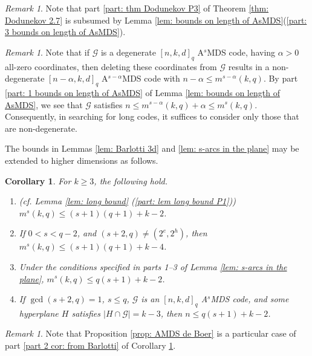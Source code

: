 \documentclass[11pt,a4paper]{amsart}
\newcommand{\AS}{ A$^s$MDS }
\newcommand{\G}{\mathcal{G}}
\theoremstyle{plain}
\newtheorem{corollary}[theorem]{Corollary}
\theoremstyle{definition}
\theoremstyle{remark}
\newtheorem{remark}[theorem]{Remark}
\begin{document}
	\begin{remark}
		Note that part  \ref{part: thm Dodunekov P3} of Theorem \ref{thm: Dodunekov 2.7}   is subsumed by Lemma \ref{lem: bounds on length of AsMDS}(\ref{part: 3 bounds on length of AsMDS}).
	\end{remark}

	\begin{remark}\label{rem: degenerate can be ignored}
		Note that if $\G$ is a degenerate $[n,k,d]_q$ \AS code, having $\alpha>0$ all-zero coordinates, then deleting these coordinates from $\G$ results in a non-degenerate $[n-\alpha, k, d]_q$ A$^{s-\alpha}$MDS code with $n-\alpha \le m^{s-\alpha}(k,q) $. By part \ref{part: 1 bounds on length of AsMDS} of Lemma \ref{lem: bounds on length of AsMDS}, we see that $\G$ satisfies $n\le m^{s-\alpha}(k,q)+\alpha \le m^s(k,q)$. Consequently, in searching for long codes, it suffices to consider only those that are non-degenerate.
	\end{remark}

	The bounds in Lemmas \ref{lem: Barlotti 3d}  and \ref{lem: s-arcs in the plane} may be extended to higher dimensions as follows.
	\begin{corollary}\label{cor: from Barlotti} For $k\ge 3$, the following hold.
		\begin{enumerate}
			\item  (cf. Lemma \ref{lem: long bound} (\ref{part: lem long bound P1}))  $m^s(k,q)\le (s+1)(q+1)+k-2$. \label{part 1 cor: from Barlotti}
			\item  If  $0<s< q-2$, and $(s+2,q) \ne (2^e,2^h)$, then $m^s(k,q)\le (s+1)(q+1)+k-4$. \label{part 2 cor: from Barlotti}
			\item Under the conditions specified in parts 1--3 of Lemma \ref{lem: s-arcs in the plane}, $m^s(k,q)\le q(s+1)+k-2$. \label{part 4 cor: from Barlotti}
			\item  If $\gcd(s+2,q)=1$, $s\le q$, $\G$ is an $[n,k,d]_q$ \AS code, and some hyperplane $H$ satisfies $|H\cap \G|=k-3$, then $n\le q(s+1)+k-2$. \label{part 6 cor: from Barlotti}
		\end{enumerate}
	\end{corollary}

	\begin{remark}
		Note that Proposition \ref{prop: AMDS de Boer} is a particular case of part \ref{part 2 cor: from Barlotti} of Corollary \ref{cor: from Barlotti}.
	\end{remark}
\end{document}
